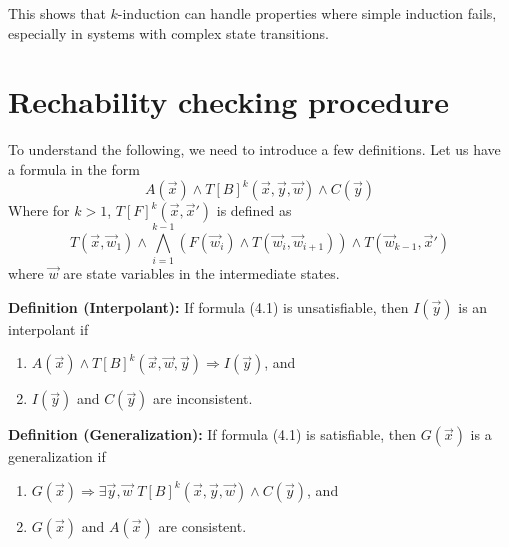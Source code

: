 \vspace{\baselineskip}This shows that \( k \)-induction can handle properties where simple induction fails, especially in systems with complex state transitions.

\section{Rechability checking procedure}

\noindent To understand the following, we need to introduce a few definitions.
Let us have a formula in the form 
\begin{equation}
    A(\vec{x}) \wedge T[B]^k(\vec{x},\vec{y},\vec{w}) \wedge C(\vec{y})
\end{equation}
Where for \( k > 1 \), \( T[F]^k(\vec{x}, \vec{x}') \) is defined as
\begin{equation*}
    T(\vec{x}, \vec{w}_1) \land \bigwedge_{i=1}^{k-1} \left( F(\vec{w}_i) \land T(\vec{w}_i, \vec{w}_{i+1}) \right) \land T(\vec{w}_{k-1}, \vec{x}')
\end{equation*}
where $\vec{w}$ are state variables in the intermediate states.


\vspace{\baselineskip}\noindent    \textbf{Definition (Interpolant)\cite{7886665}:} If formula (4.1) is unsatisfiable, then $I(\vec{y})$ is an interpolant if
    \begin{enumerate}
       \item \( A(\vec{x}) \land T[B]^k(\vec{x}, \vec{w}, \vec{y}) \Rightarrow I(\vec{y}) \), and
       \item \( I(\vec{y}) \) and \( C(\vec{y}) \) are inconsistent.
\end{enumerate}

\noindent    \textbf{Definition (Generalization)\cite{7886665}:} If formula (4.1) is satisfiable, then $G(\vec{x})$ is a generalization if
    \begin{enumerate}
        \item $G(\vec{x}) \Rightarrow \exists \vec{y}, \vec{w}$  $T[B]^k(\vec{x}, \vec{y}, \vec{w}) \wedge C(\vec{y})$, and
        \item $G(\vec{x})$ and $A(\vec{x})$ are consistent.
\end{enumerate}

\newpage

